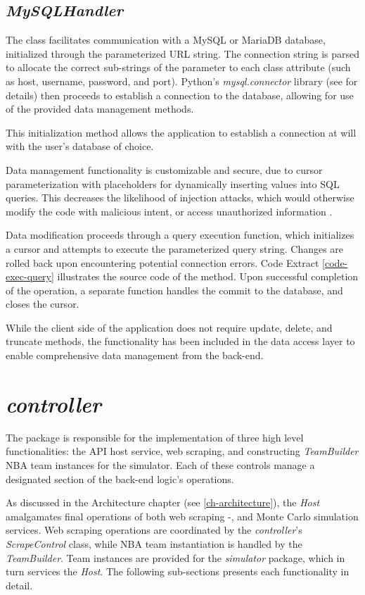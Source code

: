 \documentclass{thesis-ekf}
\theoremstyle{definition}
\theoremstyle{remark}
\begin{document}
\subsection{\emph{MySQLHandler}}
The class facilitates communication with a MySQL or MariaDB database, initialized through the parameterized URL string. The connection string is parsed to allocate the correct sub-strings of the parameter to each class attribute (such as host, username, password, and port). Python's \emph{mysql.connector} library (see \cite{mysql.conn} for details) then proceeds to establish a connection to the database, allowing for use of the provided data management methods.

This initialization method allows the application to establish a connection at will with the user's database of choice. 

Data management functionality is customizable and secure, due to cursor parameterization with placeholders for dynamically inserting values into SQL queries. This decreases the likelihood of injection attacks, which would otherwise modify the code with malicious intent, or access unauthorized information \cite{injection-attack}.

Data modification proceeds through a query execution function, which initializes a cursor and attempts to execute the parameterized query string. Changes are rolled back upon encountering potential connection errors. Code Extract \ref{code-exec-query} illustrates the source code of the method. Upon successful completion of the operation, a separate function handles the commit to the database, and closes the cursor.


While the client side of the application does not require update, delete, and truncate methods, the functionality has been included in the data access layer to enable comprehensive data management from the back-end.

\section{\emph{controller}}
The package is responsible for the implementation of three high level functionalities: the API host service, web scraping, and constructing \emph{TeamBuilder} NBA team instances for the simulator. Each of these controls manage a designated section of the back-end logic's operations. 

As discussed in the Architecture chapter (see \ref{ch-architecture}), the \emph{Host} amalgamates final operations of both web scraping -, and Monte Carlo simulation services. Web scraping operations are coordinated by the \emph{controller}'s \emph{ScrapeControl} class, while NBA team instantiation is handled by the \emph{TeamBuilder}. Team instances are provided for the \emph{simulator} package, which in turn services the \emph{Host}. The following sub-sections presents each functionality in detail.
\end{document}
